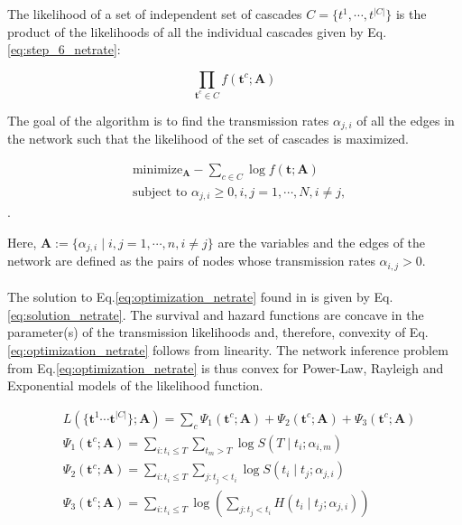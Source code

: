 The likelihood of a set of independent set of cascades $C=\{t^{1},\cdots,t^{|C|}\}$ is the product of the likelihoods of all the individual cascades given by Eq.\ref{eq:step_6_netrate}:

\begin{equation}\label{eq:step_7_netrate}
\prod _{\textbf{t}^{c}\in C}f(\textbf{t}^{c};\textbf{A})
\end{equation}

The goal of the algorithm is to find the transmission rates $\alpha_{j,i}$ of all the edges in the network such that the likelihood of the set of cascades is maximized.

\begin{subequations}
\label{eq:optimization_netrate}
\begin{align}
& \text{minimize}_{\textbf{A}} -\sum_{c\in C}\log f(\textbf{t};\textbf{A})\\
& \text{subject to } \alpha _{j,i}\geq 0,i,j=1,\cdots,N,i\neq j,
\end{align}
\end{subequations}.

Here, $\textbf{A}:=\{\alpha _{j,i}\mid i,j=1,\cdots,n,i\neq j\}$ are the variables and the edges of the network are defined as the pairs of nodes whose transmission rates $\alpha _{i,j}>0$. 
\\\\
The solution to Eq.\ref{eq:optimization_netrate} found in \cite{rodriguez2011uncovering} is given by Eq.\ref{eq:solution_netrate}. The survival and hazard functions are concave in the parameter(s) of the transmission likelihoods and, therefore, convexity of Eq.\ref{eq:optimization_netrate} follows from linearity. The network inference problem from Eq.\ref{eq:optimization_netrate} is thus convex for Power-Law, Rayleigh and Exponential models of the likelihood function.

\begin{subequations}
\begin{align}
\label{eq:solution_netrate}
& L(\{\textbf{t}^{1}\cdots \textbf{t}^{|C|}\};\textbf{A})=\sum _{c}\Psi_{1}(\textbf{t}^{c};\textbf{A})+\Psi_{2}(\textbf{t}^{c};\textbf{A})+\Psi_{3}(\textbf{t}^{c};\textbf{A})\\
& \Psi_{1}(\textbf{t}^{c};\textbf{A})=\sum _{i:t_{i}\leq T}\sum _{t_{m}>T}\log S(T\mid t_{i};\alpha _{i,m})\\
& \Psi _{2}(\textbf{t}^{c};\textbf{A})=\sum_{i:t_{i}\leq T} \sum_ {j:t_{j}<t_{i}}\log S(t_{i}\mid t_{j};\alpha_{j,i})\\
& \Psi _{3}(\textbf{t}^{c};\textbf{A})=\sum_{i:t_{i}\leq T} \log (\sum_{j:t_{j}<t_{i}} H(t_{i}\mid t_{j};\alpha_{j,i}))
\end{align}
\end{subequations}

